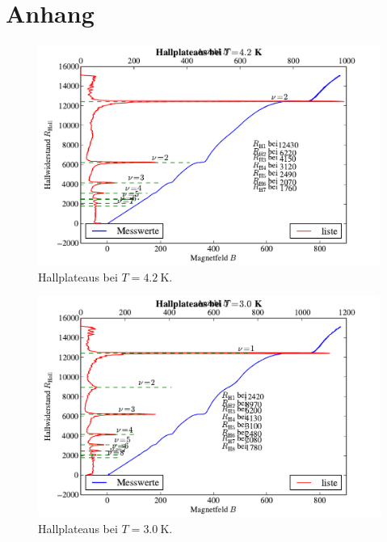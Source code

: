 \documentclass[paper=a4,fontsize=10pt,DIV=18,twocolumn,parskip=half]{scrartcl}
\numberwithin{equation}{section}    %
\begin{document}
\small

\nocite{*}

\normalsize

\onecolumn
\pagestyle{empty}
% 



\section{Anhang}
\label{Anhang}

\begin{figure}[htp]
	\begin{center}
		\includegraphics[width=\columnwidth]{Data-Plots/02-4,2-Hallplateaus.pdf}
		\caption{Hallplateaus bei $T=\SI{4.2}{\kelvin}$.}
		\label{hallplateau42}
	\end{center}
\end{figure}
\begin{figure}[htp]
	\begin{center}
		\includegraphics[width=\columnwidth]{Data-Plots/03-3,0-Hallplateaus.pdf}
		\caption{Hallplateaus bei $T=\SI{3.0}{\kelvin}$.}
		\label{hallplateau30}
	\end{center}
\end{figure}
\end{document}
